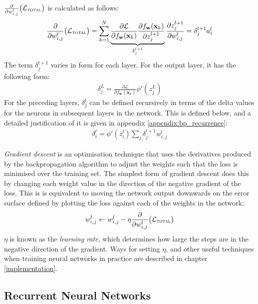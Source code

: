 \documentclass[a4paper, 12pt]{report}
\newcommand{\tit}[1]{\textit{#1}}
\begin{document}
$\frac{\partial}{\partial w_{i,j}^l} \big( \mathcal{L}_{\text{\scshape total}} \big)$ is calculated as follows:
\begin{gather} \label{eq:bp_weight_grad}
	\frac{\partial}{\partial w_{i,j}^l} \big( \mathcal{L}_{\text{\scshape total}} \big) = \sum_{k = 1}^N \underbrace{\frac{\partial \mathcal{L}}{\partial f_{\mathbf{w}}(\mathbf{x}_k)}  \frac{\partial f_{\mathbf{w}}(\mathbf{x}_k)}{\partial z_j^{l + 1}}}_{\delta_j^{l+1}}  \frac{\partial z_j^{l + 1}}{\partial w_{i,j}^l} = \delta_j^{l+1} a_i^l
\end{gather}
The term $\delta_j^{l+1}$ varies in form for each layer. For the output layer, it has the following form:
\begin{gather} \label{eq:delta_output}
	\delta_j^L = \frac{\partial \mathcal{L}}{\partial f_{\mathbf{w}}(\mathbf{x}_k)} \phi'(z_j^L)
\end{gather}
For the preceding layers, $\delta_j^l$ can be defined recursively in terms of the delta values for the neurons in subsequent layers in the network. This is defined below, and a detailed justification of it is given in appendix \ref{appendix:bp_recurrence}:
\begin{gather} \label{eq:delta_hidden}
	\delta_i^l = \phi'(z_i^l) \sum_j \delta_j^{l+1} w_{i,j}^l
\end{gather}

\tit{Gradient descent} is an optimisation technique that uses the derivatives produced by the backpropagation algorithm to adjust the weights such that the loss is minimised over the training set. The simplest form of gradient descent does this by changing each weight value in the direction of the negative gradient of the loss. This is is equivalent to moving the network output downwards on the error surface defined by plotting the loss against each of the weights in the network:
\begin{gather}
	w_{i,j}^l \leftarrow w_{i,j}^l - \eta \frac{\partial}{\partial w_{i,j}^l} \big( \mathcal{L}_{\text{\scshape total}} \big)
\end{gather}
$\eta$ is known as the \tit{learning rate}, which determines how large the steps are in the negative direction of the gradient. Ways for setting $\eta$, and other useful techniques when training neural networks in practice are described in chapter \ref{implementation}.

\subsection{Recurrent Neural Networks} \label{rnns}
\end{document}
